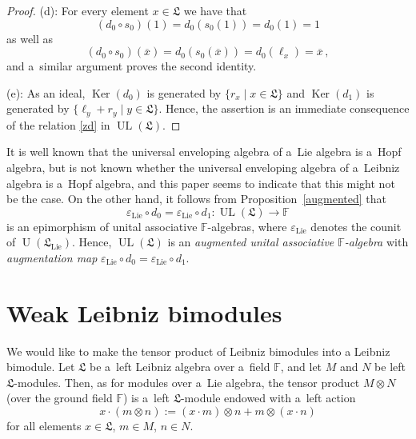 \documentclass{jonasart}
\DeclareMathOperator{\Ker}{Ker}
\DeclareMathOperator{\lie}{Lie}
\DeclareMathOperator{\U}{U}
\DeclareMathOperator{\UL}{UL}
\newcommand{\fbb}{\mathbb{F}}
\newcommand{\lf}{\mathfrak{L}}
\begin{document}
\begin{proof}
		(d): For every element $x\in\lf$ we have that
		\[
			(d_0\circ s_0 )(1)=d_0 (s_0 (1))=d_0 (1)=1
		\]
		as well as
		\[
			(d_0\circ s_0 )(\overline{x})=d_0 (s_0 (\overline{x}))=d_0 (\ell_x )=
			\overline{x}\,,
		\]
		and a~similar argument proves the second identity.

		(e): As an ideal, $\Ker(d_0 )$ is generated by $\{r_x\mid x\in\lf\}$
		and $\Ker(d_1 )$ is generated by $\{\ell_y +r_y\mid y\in\lf\}$. Hence, the assertion is an immediate consequence of the relation \eqref{zd}
		in $\UL(\lf)$.
	\end{proof}

	It is well known that the universal enveloping algebra of a~Lie algebra is a~Hopf algebra, but is not known whether the universal enveloping algebra of a~Leibniz algebra is a~Hopf algebra, and this paper seems to indicate that this might not be the case. On the other hand, it follows from Proposition~\ref{augmented} that
    \[
        \varepsilon_{\lie}\circ d_0
        = \varepsilon_{\lie}\circ d_1
        \colon \UL(\lf)\to\fbb
    \]
    is an epimorphism of unital associative $\fbb$-algebras, where $\varepsilon_{\lie}$ denotes the counit of $\U(\lf_{\lie})$. Hence, $\UL(\lf)$ is an \emph{augmented unital associative $\fbb$-algebra\/} with \emph{augmentation map\/}
	$\varepsilon_{\lie}\circ d_0 =\varepsilon_{\lie}\circ d_1$.

	\section{Weak Leibniz bimodules}\label{weak}

	We would like to make the tensor product of Leibniz bimodules into a Leibniz bimodule. Let $\lf$ be a~left Leibniz algebra over a~field
	$\fbb$, and let $M$ and $N$ be left $\lf$-modules. Then, as for modules over a~Lie algebra, the tensor product $M\otimes N$ (over the ground field $\fbb$) is a~left $\lf$-module endowed with a~left action
	\[
		x\cdot(m\otimes n):=(x\cdot m)\otimes n+m\otimes(x\cdot n)
	\]
	for all elements $x\in\lf$, $m\in M$, $n\in N$.
\end{document}
